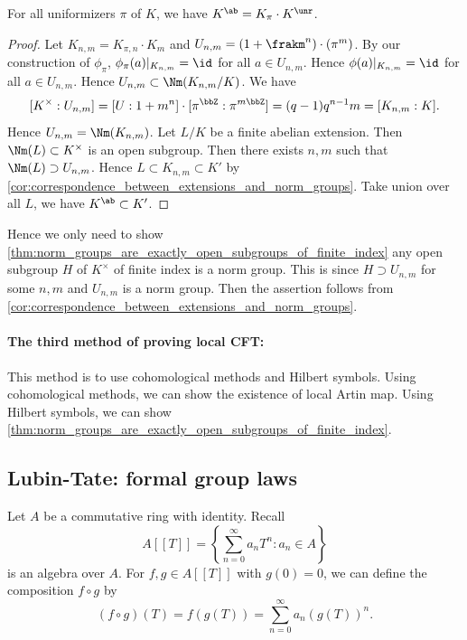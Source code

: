   \begin{theorem}
    For all uniformizers $\pi$ of $K$, we have $K^\ab = K_\pi \cdot K^\unr$.
  \end{theorem}
  \begin{proof}
    Let $K_{n,m} = K_{\pi,n} \cdot K_m$ and $U_{n,m} = (1+\frakm^n) \cdot (\pi^m)$.
    By our construction of $\phi_\pi$, $\phi_\pi(a)|_{K_{n,m}} = \id$ for all $a \in U_{n,m}$.
    Hence $\phi(a)|_{K_{n,m}} = \id$ for all $a \in U_{n,m}$.
    Hence $U_{n,m} \subset \Nm(K_{n,m}/K)$.
    We have 
    \[ [K^\times : U_{n,m}] = [U:1+m^n] \cdot [\pi^\bbZ : \pi^{m \bbZ}] = (q-1)q^{n-1}m = [K_{n,m}:K]. \] 
    Hence $U_{n,m} = \Nm(K_{n,m})$.
    Let $L/K$ be a finite abelian extension.
    Then $\Nm(L) \subset K^\times$ is an open subgroup.
    Then there exists $n,m$ such that $\Nm(L) \supset U_{n,m}$.
    Hence $L \subset K_{n,m} \subset K'$ by \cref{cor:correspondence_between_extensions_and_norm_groups}.
    Take union over all $L$, we have $K^\ab \subset K'$.
  \end{proof}

  Hence we only need to show \cref{thm:norm_groups_are_exactly_open_subgroups_of_finite_index} any open subgroup $H$ of $K^\times$ of finite index is a norm group.
  This is since $H \supset U_{n,m}$ for some $n,m$ and $U_{n,m}$ is a norm group.
  Then the assertion follows from \cref{cor:correspondence_between_extensions_and_norm_groups}.



  \paragraph{The third method of proving local CFT:}
  This method is to use cohomological methods and Hilbert symbols.
  Using cohomological methods, we can show the existence of local Artin map.
  Using Hilbert symbols, we can show \cref{thm:norm_groups_are_exactly_open_subgroups_of_finite_index}.



\subsection{Lubin-Tate: formal group laws}

  Let $A$ be a commutative ring with identity.
  Recall
  \[ A[[T]] = \left\{ \sum_{n=0}^\infty a_n T^n : a_n \in A \right\} \]
  is an algebra over $A$.
  For $f,g \in A[[T]]$ with $g(0) = 0$, we can define the composition $f \circ g$ by
  \[ (f \circ g)(T) = f(g(T)) = \sum_{n=0}^\infty a_n (g(T))^n. \]

